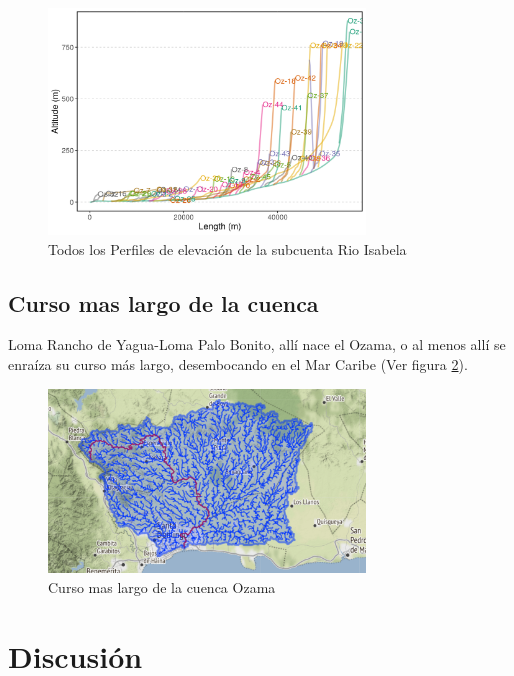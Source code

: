 \documentclass[11pt,]{article}
\begin{document}
\begin{figure}
\centering
\includegraphics[width=0.75000\textwidth]{Productos Generados/p_c_isabela.png}
\caption{\label{fig:LFP_Isabela2} Todos los Perfiles de elevación de la
subcuenta Rio Isabela}
\end{figure}

\newpage

\subsection{Curso mas largo de la
cuenca}\label{curso-mas-largo-de-la-cuenca}

Loma Rancho de Yagua-Loma Palo Bonito, allí nace el Ozama, o al menos
allí se enraíza su curso más largo, desembocando en el Mar Caribe (Ver
figura \ref{fig:c_m_l}).

\begin{figure}
\centering
\includegraphics[width=0.75000\textwidth]{Productos Generados/curso mas largo.png}
\caption{\label{fig:c_m_l} Curso mas largo de la cuenca Ozama}
\end{figure}

\newpage

\section{Discusión}\label{discusiuxf3n}
\end{document}
